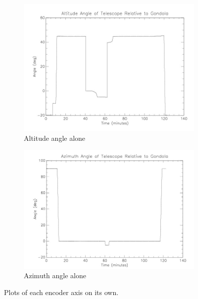\begin{figure}[htbp]
\captionsetup[subfigure]{justification=centering}
\captionsetup{justification=centering}
    \centering
	\begin{subfigure}{0.45\textwidth}
		\includegraphics[width=1\linewidth]{appendix/img/campaign_results/altitude.jpg}
		\caption{Altitude angle alone}
		\label{fig:sub:alt}
	\end{subfigure}
	\begin{subfigure}{0.45\textwidth}
		\includegraphics[width=1\linewidth]{appendix/img/campaign_results/azimuth.jpg}
		\caption{Azimuth angle alone}
		\label{fig:sub:az}
	\end{subfigure}
	\caption{Plots of each encoder axis on its own.}
\end{figure}

